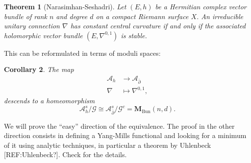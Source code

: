 \documentclass[12pt,a4paper]{book}
\newtheorem{thm}{Theorem}[section]
\newtheorem{corol}[thm]{Corollary}
\theoremstyle{definition} \newtheorem{defn}[thm]{Definition}
\theoremstyle{definition} \newtheorem{ejemplo}[thm]{Example}
\theoremstyle{remark} \newtheorem{rem}[thm]{Remark}
\def\AA{\mathscr{A}}
\def\GG{\mathscr{G}}
\def\Bun{\mathbf{M}_{\mathrm{Bun}}}
\def\delbar{\bar{\partial}}
\begin{document}
\begin{thm}[Narasimhan-Seshadri]\label{narasimhanseshadri}
  Let $(E,h)$ be a Hermitian complex vector bundle of rank $n$ and degree $d$ on a compact Riemann surface $X$. An irreducible unitary connection $\nabla$ has constant central curvature if and only if the associated holomorphic vector bundle $(E,\nabla^{0,1})$ is stable.
\end{thm}
This can be reformulated in terms of moduli spaces:
\begin{corol}
  The map
  \begin{align*}
    \AA_h&\longrightarrow \AA_{\delbar}\\ 
     \nabla &\longmapsto \nabla^{0,1}, 
    \end{align*}
    descends to a homeomorphism
    \begin{equation*}
      \AA_h^s/\GG \cong \AA^s_{\delbar} /\GG^c = \Bun(n,d).
    \end{equation*}
\end{corol}
We will prove the ``easy'' direction of the equivalence. The proof in the other direction consists in defining a Yang-Mills functional and looking for a minimum of it using analytic techniques, in particular a theorem by Uhlenbeck [REF:Uhlenbeck?]. Check \cite{donaldson} for the details.
\end{document}
